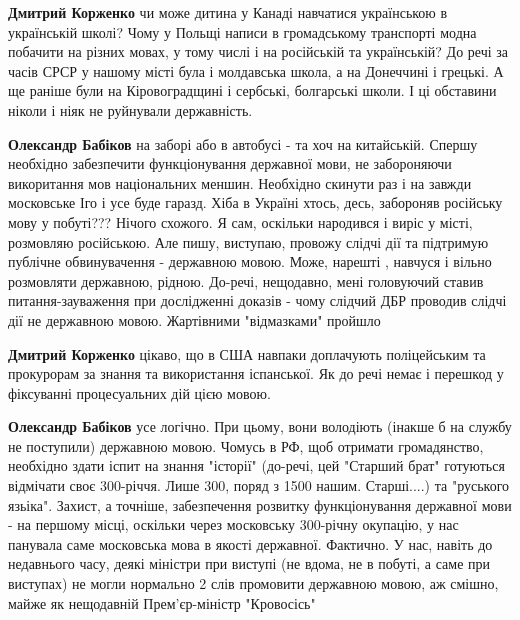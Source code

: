 \begin{itemize}
\begin{itemize}
\textbf{Дмитрий Корженко} чи може дитина у Канаді навчатися українською в
українській школі? Чому у Польщі написи в громадському транспорті модна
побачити на різних мовах, у тому числі і на російській та українській? До речі
за часів СРСР у нашому місті була і молдавська школа, а на Донеччині і грецькі.
А ще раніше були на Кіровоградщині і сербські, болгарські школи. І ці обставини
ніколи і ніяк не руйнували державність.

 
\textbf{Олександр Бабіков} на заборі або в автобусі - та хоч на китайській.
Спершу необхідно забезпечити функціонування державної мови, не забороняючи
викоритання мов національних меншин. Необхідно скинути раз і на завжди
московське Іго і усе буде гаразд. Хіба в Україні хтось, десь, забороняв
російську мову у побуті??? Нічого схожого. Я сам, оскільки народився і виріс у
місті, розмовляю російською. Але пишу, виступаю, провожу слідчі дії та
підтримую публічне обвинувачення - державною мовою. Може, нарешті , навчуся і
вільно розмовляти державною, рідною. До-речі, нещодавно, мені головуючий ставив
питання-зауваження при дослідженні доказів - чому слідчий ДБР проводив слідчі
дії не державною мовою. Жартівними "відмазками" пройшло

 
\textbf{Дмитрий Корженко} цікаво, що в США навпаки доплачують поліцейським та
прокурорам за знання та використання іспанської. Як до речі немає і перешкод у
фіксуванні процесуальних дій цією мовою.

 
\textbf{Олександр Бабіков} усе логічно. При цьому, вони володіють (інакше б на
службу не поступили) державною мовою. Чомусь в РФ, щоб отримати громадянство,
необхідно здати іспит на знання "історії" (до-речі, цей "Старший брат"
готуються відмічати своє 300-річчя. Лише 300, поряд з 1500 нашим. Старші....)
та "руського язьіка". Захист, а точніше, забезпечення розвитку функціонування
державної мови - на першому місці, оскільки через московську 300-річну
окупацію, у нас панувала саме московська мова в якості державної. Фактично. У
нас, навіть до недавнього часу, деякі міністри при виступі (не вдома, не в
побуті, а саме при виступах) не могли нормально 2 слів промовити державною
мовою, аж смішно, майже як нещодавній Прем'єр-міністр "Кровосісь"


\end{itemize}
\end{itemize}
